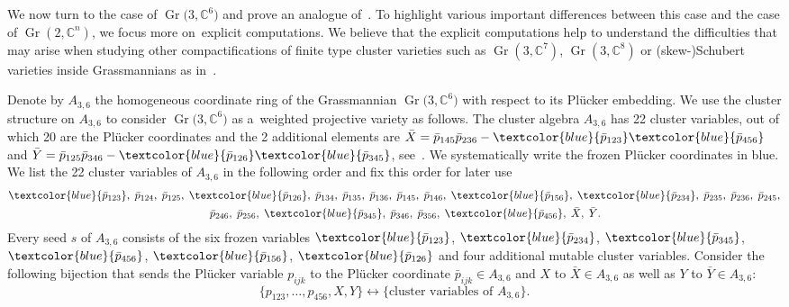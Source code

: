 \documentclass[pdftex]{sigma}%
\numberwithin{equation}{section}
\DeclareMathOperator{\Gr}{Gr}
\begin{document}
We now turn to the case of $\Gr\big(3,\mathbb C^6\big)$ and prove an analogue of~. To highlight various important differences between this case and the case of $\Gr(2,\mathbb C^n)$, we focus more on~explicit computations.
We believe that the explicit computations help to understand the difficulties that may arise when studying other compactifications of finite type cluster varieties such as $\Gr(3,\mathbb C^7)$, $\Gr(3,\mathbb C^8)$ or (skew-)Schubert varieties inside Grassmannians as in~\cite{SSBW}.


Denote by $A_{3,6}$ the homogeneous coordinate ring of the Grassmannian $\Gr\big(3,\mathbb C^6\big)$ with res\-pect to its Pl\"ucker embedding.
We use the cluster structure on $A_{3,6}$ to consider $\Gr\big(3,\mathbb C^6\big) $ as a~weighted projective variety
as follows.
The cluster algebra $A_{3,6}$ has 22 cluster variables, out of which 20 are the Pl\"ucker coordinates and the 2 additional elements are $\bar X=\bar p_{145}\bar p_{236}-\textcolor{blue}{\bar p_{123}}\textcolor{blue}{\bar p_{456}}$ and $\bar Y=\bar p_{125}\bar p_{346}-\textcolor{blue}{\bar p_{126}}\textcolor{blue}{\bar p_{345}}$, see~\cite[Theorem~6]{Sco06}.
We systematically write the frozen Pl\"ucker coordinates in {\color{blue}blue}.
We list the 22 cluster variables of $A_{3,6}$ in the following order and fix this order for later use
\begin{gather}\nonumber
\textcolor{blue}{\bar p_{123}},\;\bar p_{124},\;\bar p_{125},\; \textcolor{blue}{\bar p_{126}},\;\bar p_{134},\;\bar p_{135},\;\bar p_{136},\;\bar p_{145},\;\bar p_{146},\;\textcolor{blue}{\bar p_{156}},\;
\textcolor{blue}{\bar p_{234}},\;\bar p_{235},\;\bar p_{236},\;
\bar p_{245},
\\ \qquad
\bar p_{246},\;\bar p_{256},\; \textcolor{blue}{\bar p_{345}},\;\bar p_{346},\;\bar p_{356},\;\textcolor{blue}{\bar p_{456}},\;\bar X,\;\bar Y.
\label{eq:order variables}
\end{gather}
Every seed $s$ of $A_{3,6}$ consists of the six frozen variables $\textcolor{blue}{\bar p_{123}}$, $\textcolor{blue}{\bar p_{234}}$, $\textcolor{blue}{\bar p_{345}}$, $\textcolor{blue}{\bar p_{456}}$, $\textcolor{blue}{\bar p_{156}}$, $\textcolor{blue}{\bar p_{126}}$
and four additional mutable cluster variables.
Consider the following bijection that sends the Pl\"ucker variable $p_{ijk}$ to the Pl\"ucker coordinate $\bar p_{ijk}\in A_{3,6}$ and $X$ to $\bar X\in A_{3,6}$ as well as $Y$ to $\bar Y\in A_{3,6}$:
\begin{equation}\label{eq:identification}
 \{p_{123}, \dots , p_{456}, X,Y \} \longleftrightarrow \{ \text{cluster variables of }A_{3,6}\}.
\end{equation}
\end{document}
